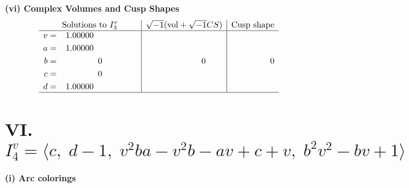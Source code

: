 \documentclass[1p]{elsarticle_modified}
\theoremstyle{definition}
\newcommand{\I}{\sqrt{-1}}
\begin{document}
\newpage\flushleft \textbf{(vi) Complex Volumes and Cusp Shapes}
$$\begin{array}{c|c|c}  
\text{Solutions to }I^v_{3}& \I (\text{vol} + \sqrt{-1}CS) & \text{Cusp shape}\\
 \hline 
\begin{aligned}
v &= \phantom{-}1.00000\phantom{ +0.000000I} \\
a &= \phantom{-}1.00000\phantom{ +0.000000I} \\
b &= \phantom{-0.000000 } 0 \\
c &= \phantom{-0.000000 } 0 \\
d &= \phantom{-}1.00000\phantom{ +0.000000I}\end{aligned}
 & \phantom{-0.000000 } 0 & \phantom{-0.000000 } 0\\
 \hline 
 \end{array}$$\newpage\newpage\renewcommand{\arraystretch}{1}
\centering \section*{VI. $I^v_{4}= \langle c,\;d-1,\;v^2 b a- v^2 b- a v+c+v,\;b^2 v^2- b v+1 \rangle$}
\flushleft \textbf{(i) Arc colorings}\\
\end{document}
